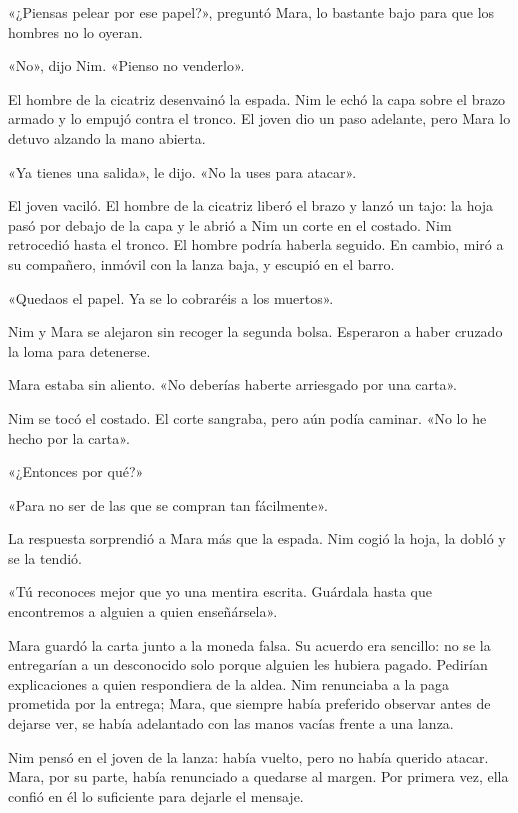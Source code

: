 \documentclass[10pt,a4paper]{article}
\begin{document}
«¿Piensas pelear por ese papel?», preguntó Mara, lo bastante bajo para que los hombres no lo oyeran.

«No», dijo Nim. «Pienso no venderlo».

El hombre de la cicatriz desenvainó la espada. Nim le echó la capa sobre el brazo armado y lo empujó contra el tronco. El joven dio un paso adelante, pero Mara lo detuvo alzando la mano abierta.

«Ya tienes una salida», le dijo. «No la uses para atacar».

El joven vaciló. El hombre de la cicatriz liberó el brazo y lanzó un tajo: la hoja pasó por debajo de la capa y le abrió a Nim un corte en el costado. Nim retrocedió hasta el tronco. El hombre podría haberla seguido. En cambio, miró a su compañero, inmóvil con la lanza baja, y escupió en el barro.

«Quedaos el papel. Ya se lo cobraréis a los muertos».

Nim y Mara se alejaron sin recoger la segunda bolsa. Esperaron a haber cruzado la loma para detenerse.

Mara estaba sin aliento. «No deberías haberte arriesgado por una carta».

Nim se tocó el costado. El corte sangraba, pero aún podía caminar. «No lo he hecho por la carta».

«¿Entonces por qué?»

«Para no ser de las que se compran tan fácilmente».

La respuesta sorprendió a Mara más que la espada. Nim cogió la hoja, la dobló y se la tendió.

«Tú reconoces mejor que yo una mentira escrita. Guárdala hasta que encontremos a alguien a quien enseñársela».

Mara guardó la carta junto a la moneda falsa. Su acuerdo era sencillo: no se la entregarían a un desconocido solo porque alguien les hubiera pagado. Pedirían explicaciones a quien respondiera de la aldea. Nim renunciaba a la paga prometida por la entrega; Mara, que siempre había preferido observar antes de dejarse ver, se había adelantado con las manos vacías frente a una lanza.

Nim pensó en el joven de la lanza: había vuelto, pero no había querido atacar. Mara, por su parte, había renunciado a quedarse al margen. Por primera vez, ella confió en él lo suficiente para dejarle el mensaje.
\end{document}
